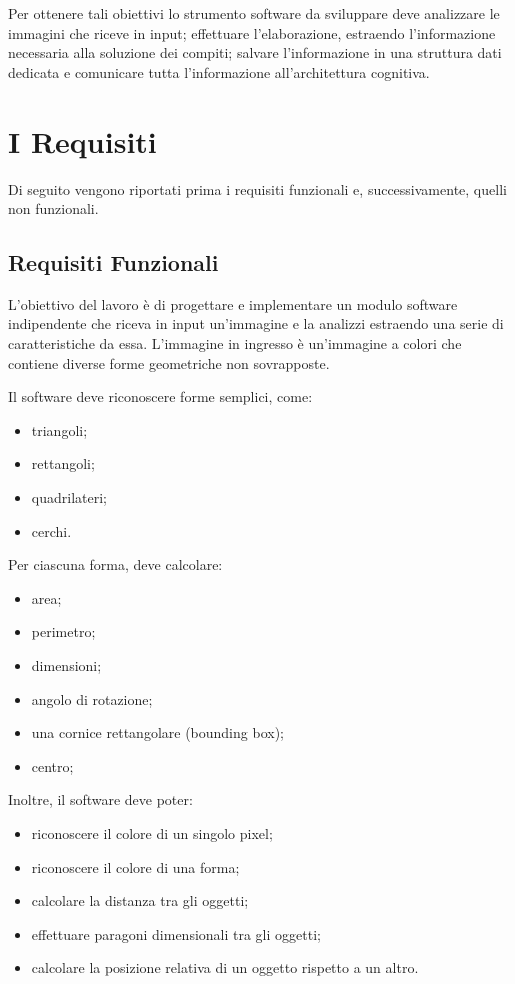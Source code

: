 		Per ottenere tali obiettivi lo strumento software da sviluppare deve analizzare le immagini che riceve in input; effettuare l'elaborazione, estraendo l'informazione necessaria alla soluzione dei compiti; salvare l'informazione in una struttura dati dedicata e comunicare tutta l'informazione all'architettura cognitiva.
		

	\section*{I Requisiti}
		Di seguito vengono riportati prima i requisiti funzionali e, successivamente, quelli non funzionali.
			
		\subsection*{Requisiti Funzionali}
			L'obiettivo del lavoro è di progettare e implementare un modulo software indipendente che riceva in input un'immagine e la analizzi estraendo una serie di caratteristiche da essa.
			L'immagine in ingresso è un'immagine a colori che contiene diverse forme geometriche non sovrapposte. 

			Il software deve riconoscere forme semplici, come:
			\begin{itemize}
	    		\item triangoli;
				\item rettangoli;
				\item quadrilateri;
				\item cerchi.
			\end{itemize}

			Per ciascuna forma, deve calcolare:
			\begin{itemize}
				\item area;
				\item perimetro;
				\item dimensioni;
				\item angolo di rotazione;
				\item una cornice rettangolare (bounding box);
				\item centro;
			\end{itemize}	
		
			Inoltre, il software deve poter:
			\begin{itemize}
				\item riconoscere il colore di un singolo pixel;
				\item riconoscere il colore di una forma;
				\item calcolare la distanza tra gli oggetti;			
				\item effettuare paragoni dimensionali tra gli oggetti;
				\item calcolare la posizione relativa di un oggetto rispetto a un altro.
			\end{itemize}

